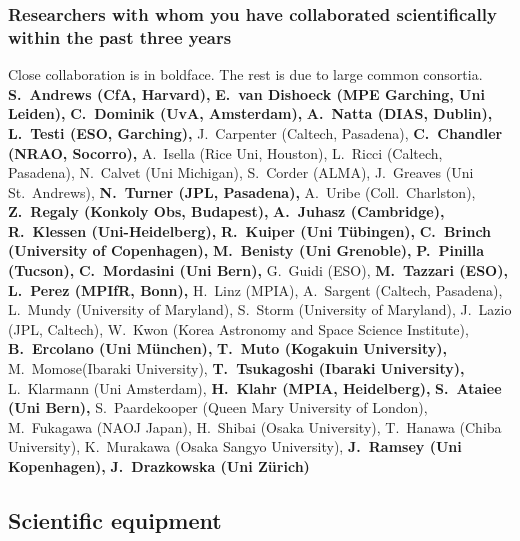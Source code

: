 \documentclass[10pt,fleqn,twoside]{article}
\begin{document}
\todo{[Text]}

\subsubsection{Researchers with whom you have collaborated scientifically within the past three years}

{\small
Close collaboration is in boldface. The rest is due to large common consortia.\\
{\bf S.~Andrews (CfA, Harvard),}
{\bf E.~van Dishoeck (MPE Garching, Uni Leiden),}
{\bf C.~Dominik (UvA, Amsterdam),}
{\bf A.~Natta (DIAS, Dublin),}
{\bf L.~Testi (ESO, Garching),}
J.~Carpenter (Caltech, Pasadena),
{\bf C.~Chandler (NRAO, Socorro),}
A.~Isella (Rice Uni, Houston),
L.~Ricci (Caltech, Pasadena),
N.~Calvet (Uni Michigan),
S.~Corder (ALMA),
J.~Greaves (Uni St.~Andrews),
{\bf N.~Turner (JPL, Pasadena),}
A.~Uribe (Coll.~Charlston),
{\bf Z.~Regaly (Konkoly Obs, Budapest),}
{\bf A.~Juhasz (Cambridge),}
{\bf R.~Klessen (Uni-Heidelberg),}
{\bf R.~Kuiper (Uni T\"ubingen),}
{\bf C.~Brinch (University of Copenhagen),}
{\bf M.~Benisty (Uni Grenoble),}
{\bf P.~Pinilla (Tucson),}
{\bf C.~Mordasini (Uni Bern),}
G.~Guidi (ESO),
{\bf M.~Tazzari (ESO),}
{\bf L.~Perez (MPIfR, Bonn),}
H.~Linz (MPIA),
A.~Sargent (Caltech, Pasadena),
L.~Mundy (University of Maryland),
S.~Storm (University of Maryland),
J.~Lazio (JPL, Caltech),
W.~Kwon (Korea Astronomy and Space Science Institute),
{\bf B.~Ercolano (Uni M\"unchen),}
{\bf T.~Muto (Kogakuin University),}
M.~Momose(Ibaraki University),
{\bf T.~Tsukagoshi (Ibaraki University),}
L.~Klarmann (Uni Amsterdam),
{\bf H.~Klahr (MPIA, Heidelberg),}
{\bf S.~Ataiee (Uni Bern),}
S.~Paardekooper (Queen Mary University of London),
M.~Fukagawa (NAOJ Japan),
H.~Shibai (Osaka University),
T.~Hanawa (Chiba University),
K.~Murakawa (Osaka Sangyo University),
{\bf J.~Ramsey (Uni Kopenhagen),}
{\bf J.~Drazkowska (Uni Z\"urich)}
}

\subsection{Scientific equipment}
\end{document}
